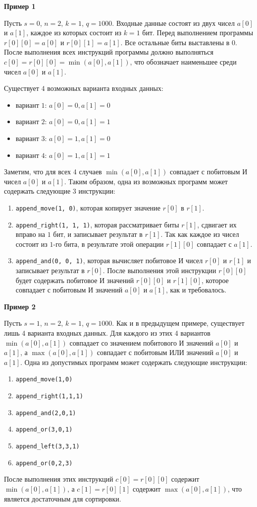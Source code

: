 \textbf{Пример 1}

Пусть $s = 0$, $n = 2$, $k = 1$, $q = 1000$. Входные данные состоят из двух чисел $a[0]$ и $a[1]$, каждое из которых состоит из $k=1$ бит. Перед выполнением программы $r[0][0] = a[0]$ и $r[0][1] = a[1]$. Все остальные биты выставлены в $0$. После выполнения всех инструкций программы должно выполняться $c[0]=r[0][0] = \min(a[0], a[1])$, что обозначает наименьшее среди чисел $a[0]$ и $a[1]$.

Существует 4 возможных варианта входных данных:
\begin{itemize}
\item вариант $1$: $a[0]=0, a[1]=0$
\item вариант $2$: $a[0]=0, a[1]=1$
\item вариант $3$: $a[0]=1, a[1]=0$
\item вариант $4$: $a[0]=1, a[1]=1$
\end{itemize}

Заметим, что для всех 4 случаев $\min(a[0], a[1])$ совпадает с побитовым И чисел $a[0]$ и $a[1]$. Таким образом, одна из возможных программ может содержать следующие 3 инструкции:
\begin{enumerate}
\item \texttt{append\_move(1, 0)}, которая копирует значение $r[0]$ в $r[1]$.
\item \texttt{append\_right(1, 1, 1)}, которая рассматривает биты $r[1]$, сдвигает их вправо на $1$ бит, и записывает результат в $r[1]$. Так как каждое из чисел состоит из $1$-го бита, в результате этой операции $r[1][0]$ совпадает с $a[1]$.
\item \texttt{append\_and(0, 0, 1)}, которая вычисляет побитовое И чисел $r[0]$ и $r[1]$ и записывает результат в $r[0]$. После выполнения этой инструкции $r[0][0]$ будет содержать побитовое И значений $r[0][0]$ и $r[1][0]$, которое совпадает с побитовым И значений $a[0]$ и $a[1]$, как и требовалось.
\end{enumerate}


\textbf{Пример 2}

Пусть $s=1$, $n=2$, $k=1$, $q=1000$. Как и в предыдущем примере, существует лишь 4 варианта входных данных. Для каждого из этих 4 вариантов $\min(a[0], a[1])$ совпадает со значением побитового И значений $a[0]$ и $a[1]$, а $\max(a[0], a[1])$ совпадает с побитовым ИЛИ значений $a[0]$ и $a[1]$. Одна из допустимых программ может содержать следующие инструкции:
\begin{enumerate}
\item \texttt{append\_move(1,0)}
\item \texttt{append\_right(1,1,1)}
\item \texttt{append\_and(2,0,1)}
\item \texttt{append\_or(3,0,1)}
\item \texttt{append\_left(3,3,1)}
\item \texttt{append\_or(0,2,3)}
\end{enumerate}

После выполнения этих инструкций $c[0]=r[0][0]$ содержит $\min(a[0],a[1])$, а $c[1]=r[0][1]$ содержит $\max(a[0],a[1])$, что является достаточным для сортировки.